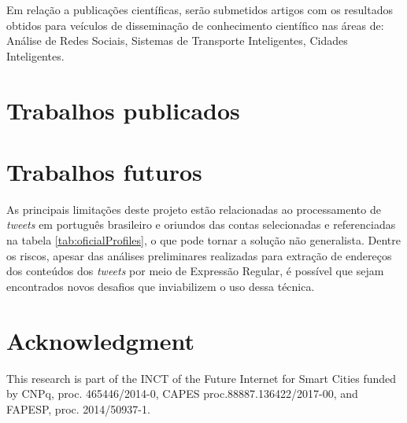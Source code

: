\documentclass[
	12pt,				%
	oneside,			%
	a4paper,			%
	english,			%
	brazil				%
	]{abntex2ppgsi}
\begin{document}
Em relação a publicações científicas, serão submetidos artigos com os resultados obtidos para veículos de disseminação de conhecimento científico nas áreas de: Análise de Redes Sociais, Sistemas de Transporte Inteligentes, Cidades Inteligentes.

\section{Trabalhos publicados}

\section{Trabalhos futuros}
As principais limitações deste projeto estão relacionadas ao processamento de \textit{tweets} em português brasileiro e oriundos das contas selecionadas e referenciadas na tabela \ref{tab:oficialProfiles}, o que pode tornar a solução não generalista. Dentre os riscos, apesar das análises preliminares realizadas para extração de endereços dos conteúdos dos \textit{tweets} por meio de Expressão Regular, é possível que sejam encontrados novos desafios que inviabilizem o uso dessa técnica.

\section*{Acknowledgment}
This research is part of the INCT of the Future Internet for Smart Cities funded by CNPq, proc. 465446/2014-0, CAPES proc.88887.136422/2017-00, and FAPESP, proc. 2014/50937-1.

\postextual

\listoftodos[Notes]


%
%

\end{document}
